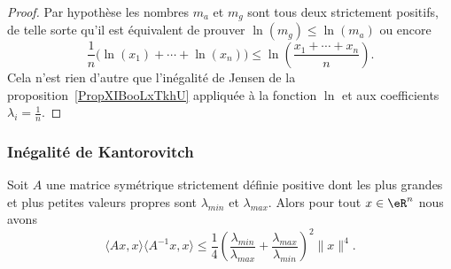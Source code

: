 \begin{proof}
	Par hypothèse les nombres \( m_a\) et \( m_g\) sont tous deux strictement positifs, de telle sorte qu'il est équivalent de prouver \( \ln(m_g)\leq \ln(m_a)\) ou encore
	\begin{equation}
		\frac{1}{ n }\big( \ln(x_1)+\cdots +\ln(x_n) \big)\leq \ln\left( \frac{ x_1+\cdots +x_n }{ n } \right).
	\end{equation}
	Cela n'est rien d'autre que l'inégalité de Jensen de la proposition~\ref{PropXIBooLxTkhU} appliquée à la fonction \( \ln\) et aux coefficients \( \lambda_i=\frac{1}{ n }\).
\end{proof}

\subsubsection{Inégalité de Kantorovitch}

\begin{proposition}    \label{PropMNUooFbYkug}
	Soit \( A\) une matrice symétrique strictement définie positive dont les plus grandes et plus petites valeurs propres sont \( \lambda_{min}\) et \( \lambda_{max}\). Alors pour tout \( x\in \eR^n\) nous avons
	\begin{equation}
		\langle Ax, x\rangle \langle A^{-1}x, x\rangle \leq \frac{1}{ 4 }\left( \frac{ \lambda_{min} }{ \lambda_{max} }+\frac{ \lambda_{max} }{ \lambda_{min} } \right)^2\| x \|^4.
	\end{equation}
\end{proposition}


